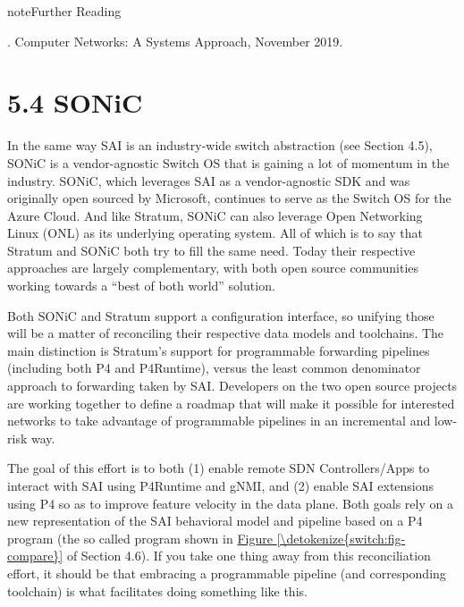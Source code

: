 \documentclass[letterpaper,11pt,english]{sphinxmanual}
\begin{document}
\label{\detokenize{stratum:reading-protobuf}}
\begin{sphinxadmonition}{note}{Further Reading}

.
Computer Networks: A Systems Approach, November 2019.
\end{sphinxadmonition}


\section{5.4 SONiC}
\label{\detokenize{stratum:sonic}}
In the same way SAI is an industry-wide switch abstraction (see
Section 4.5), SONiC is a vendor-agnostic Switch OS that is gaining a
lot of momentum in the industry. SONiC, which leverages SAI as a
vendor-agnostic SDK and was originally open sourced by Microsoft,
continues to serve as the Switch OS for the Azure Cloud. And like
Stratum, SONiC can also leverage Open Networking Linux (ONL) as its
underlying operating system. All of which is to say that Stratum and
SONiC both try to fill the same need. Today their respective
approaches are largely complementary, with both open source
communities working towards a “best of both world” solution.

Both SONiC and Stratum support a configuration interface, so unifying
those will be a matter of reconciling their respective data models and
toolchains. The main distinction is Stratum’s support for programmable
forwarding pipelines (including both P4 and P4Runtime), versus the
least common denominator approach to forwarding taken by
SAI. Developers on the two open source projects are working together
to define a roadmap that will make it possible for interested networks
to take advantage of programmable pipelines in an incremental and
low-risk way.

The goal of this effort is to both (1) enable remote SDN
Controllers/Apps to interact with SAI using P4Runtime and gNMI,
and (2) enable SAI extensions using P4 so as to improve feature
velocity in the data plane. Both goals rely on a new representation of
the SAI behavioral model and pipeline based on a P4 program (the so
called  program shown in \hyperref[\detokenize{switch:fig-compare}]{Figure \ref{\detokenize{switch:fig-compare}}}
of Section 4.6). If you take one thing away from this reconciliation
effort, it should be that embracing a programmable pipeline (and
corresponding toolchain) is what facilitates doing something like
this.
\end{document}
